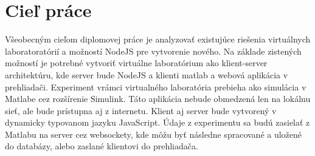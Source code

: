 
\section{Cieľ práce}
Všeobecným cieľom diplomovej práce je analyzovať existujúce riešenia virtuálnych laboratoratórií a možností NodeJS pre vytvorenie nového.
Na základe zistených možností je potrebné vytvoriť virtuálne laboratórium ako klient-server architektúru, kde server bude NodeJS a klienti matlab a webová aplikácia v prehliadači. Experiment vrámci virtualného laboratória prebieha ako simulácia v Matlabe cez rozšírenie Simulink. Táto aplikácia nebude obmedzená len na lokálnu sieť, ale bude prístupna aj z internetu. Klient aj server bude vytvorený v dynamicky typovanom jazyku JavaScript. Údaje z experimentu sa budú zasielať z Matlabu na server cez websockety, kde môžu byť následne spracované a uložené do databázy, alebo zaslané klientovi do prehliadača.


